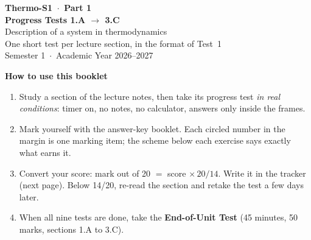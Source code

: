 \documentclass{ibetest}
\begin{document}
\testheader
\vspace{16mm}
\begin{center}
  {\sffamily\bfseries\Huge Thermo-S1 \,$\cdot$\, Part 1}\\[6pt]
  {\sffamily\bfseries\LARGE Progress Tests 1.A $\to$ 3.C}\\[8pt]
  {\large Description of a system in thermodynamics}\\[3pt]
  {\normalsize One short test per lecture section, in the format of Test~1}\\[3pt]
  {\normalsize Semester 1 \,$\cdot$\, Academic Year 2026--2027}
\end{center}
\vspace{10mm}

{\sffamily\bfseries How to use this booklet}
\begin{enumerate}[leftmargin=7mm, itemsep=3pt]
  \item Study a section of the lecture notes, then take its progress test \emph{in real
        conditions}: timer on, no notes, no calculator, answers only inside the frames.
  \item Mark yourself with the answer-key booklet. Each circled number in the margin is one
        marking item; the scheme below each exercise says exactly what earns it.
  \item Convert your score: mark out of 20 $=$ score $\times\,20/14$. Write it in the tracker
        (next page). Below 14/20, re-read the section and retake the test a few days later.
  \item When all nine tests are done, take the \textbf{End-of-Unit Test} (45 minutes,
        50 marks, sections 1.A to 3.C).
\end{enumerate}
\end{document}
